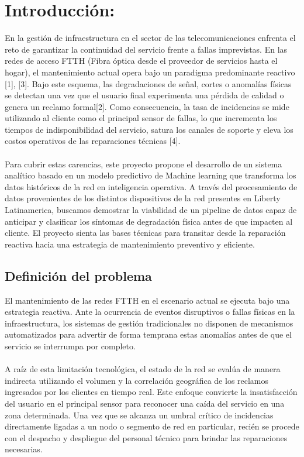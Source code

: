 \documentclass[12pt,a4paper]{article}
\begin{document}
    \section{Introducción:}
    \noindent
    En la gestión de infraestructura en el sector de las telecomunicaciones enfrenta el reto de garantizar la continuidad del servicio frente a fallas imprevistas. En las redes de acceso
    FTTH (Fibra óptica desde el proveedor de servicios hasta el hogar), el mantenimiento actual opera bajo un paradigma predominante reactivo [1], [3]. Bajo este esquema, las degradaciones de señal, cortes o anomalías físicas se detectan una vez
    que el usuario final experimenta una pérdida de calidad o genera un reclamo formal[2]. Como consecuencia, la tasa de incidencias se mide utilizando al cliente como el principal sensor de fallas, lo que incrementa los tiempos de indisponibilidad del servicio,
    satura los canales de soporte y eleva los costos operativos de las reparaciones técnicas [4].\\\\
    
    \noindent
    Para cubrir estas carencias, este proyecto propone el desarrollo de un sistema analítico basado en un modelo predictivo de Machine learning que transforma los datos históricos de la red en inteligencia operativa. A través del procesamiento de datos provenientes
    de los distintos dispositivos de la red presentes en Liberty Latinamerica, buscamos demostrar la viabilidad de un pipeline de datos capaz de anticipar y clasificar los síntomas de degradación física antes de que impacten al cliente. El proyecto sienta las bases técnicas para transitar desde la reparación reactiva hacia una estrategia de mantenimiento preventivo y eficiente.

    \subsection{Definición del problema}
    \noindent
    El mantenimiento de las redes FTTH en el escenario actual se ejecuta bajo una estrategia reactiva. Ante la ocurrencia de eventos disruptivos o fallas físicas en la infraestructura,
    los sistemas de gestión tradicionales no disponen de mecanismos automatizados para advertir de forma temprana estas anomalías antes de que el servicio se interrumpa por completo.\\\\


    \noindent
    A raíz de esta limitación tecnológica, el estado de la red se evalúa de manera indirecta utilizando el volumen y la correlación geográfica de los reclamos ingresados por los clientes en tiempo real. Este enfoque
    convierte la insatisfacción del usuario en el principal sensor para reconocer una caída del servicio en una zona determinada. Una vez que se alcanza un umbral crítico de incidencias directamente ligadas a un nodo
    o segmento de red en particular, recién se procede con el despacho y despliegue del personal técnico para brindar las reparaciones necesarias.\\\\
    
\end{document}
